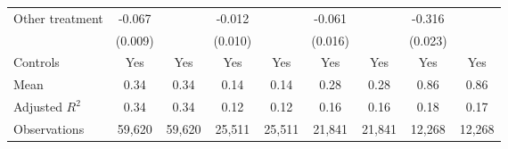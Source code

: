 {\begin{tabular}{l*{8}{c}}
Other treatment     &      -0.067\sym{***}&                     &      -0.012         &                     &      -0.061\sym{***}&                     &      -0.316\sym{***}&                     \\
                    &     (0.009)         &                     &     (0.010)         &                     &     (0.016)         &                     &     (0.023)         &                     \\
Controls            &         Yes         &         Yes         &         Yes         &         Yes         &         Yes         &         Yes         &         Yes         &         Yes         \\
\hline
Mean                &        0.34         &        0.34         &        0.14         &        0.14         &        0.28         &        0.28         &        0.86         &        0.86         \\
Adjusted \(R^{2}\)  &        0.34         &        0.34         &        0.12         &        0.12         &        0.16         &        0.16         &        0.18         &        0.17         \\
Observations        &      59,620         &      59,620         &      25,511         &      25,511         &      21,841         &      21,841         &      12,268         &      12,268         \\
\hline\hline
\end{tabular}
}

